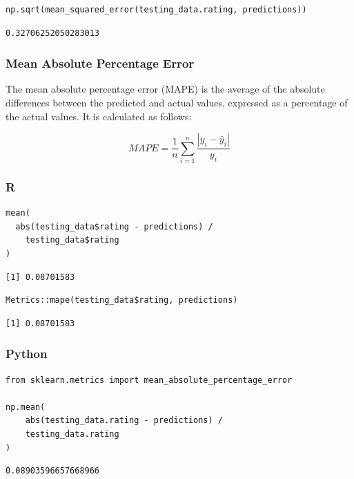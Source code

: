\documentclass[
  letterpaper,
]{krantz}
\begin{document}
\begin{verbatim}
np.sqrt(mean_squared_error(testing_data.rating, predictions))
\end{verbatim}

\begin{verbatim}
0.32706252050283013
\end{verbatim}

\subsubsection{Mean Absolute Percentage
Error}\label{sec-knowing-metrics-mape}

The mean absolute percentage error (MAPE) is the average of the absolute
differences between the predicted and actual values, expressed as a
percentage of the actual values. It is calculated as follows:

\[MAPE = \frac{1}{n}\sum_{i=1}^{n}\frac{|y_i - \hat{y}_i|}{y_i}\]

\subsubsection{R}

\begin{verbatim}
mean(
  abs(testing_data$rating - predictions) / 
    testing_data$rating
)
\end{verbatim}

\begin{verbatim}
[1] 0.08701583
\end{verbatim}

\begin{verbatim}
Metrics::mape(testing_data$rating, predictions)
\end{verbatim}

\begin{verbatim}
[1] 0.08701583
\end{verbatim}

\subsubsection{Python}

\begin{verbatim}
from sklearn.metrics import mean_absolute_percentage_error

np.mean(
    abs(testing_data.rating - predictions) / 
    testing_data.rating
)
\end{verbatim}

\begin{verbatim}
0.08903596657668966
\end{verbatim}
\end{document}
